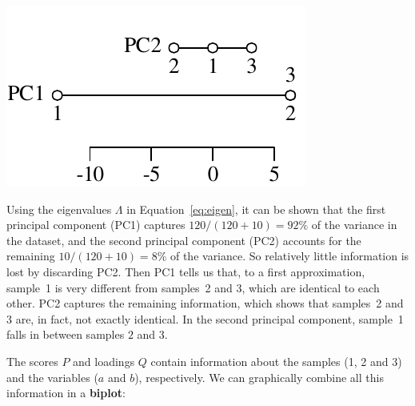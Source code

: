 \noindent\begin{minipage}[t][][b]{.27\textwidth}
  \includegraphics[width=\textwidth]{../figures/PCA2D2.pdf}\medskip
\end{minipage}
\begin{minipage}[t][][t]{.73\textwidth}
  \label{fig:PCA2D2}
\end{minipage}

Using the eigenvalues $\Lambda$ in Equation~\ref{eq:eigen}, it can be
shown that the first principal component (PC1) captures
$120/(120+10)=92\%$ of the variance in the dataset, and the second
principal component (PC2) accounts for the remaining $10/(120+10)=8\%$
of the variance. So relatively little information is lost by
discarding PC2. Then PC1 tells us that, to a first approximation,
sample~1 is very different from samples~2 and 3, which are identical
to each other. PC2 captures the remaining information, which shows
that samples~2 and 3 are, in fact, not exactly identical. In the
second principal component, sample~1 falls in between samples $2$ and
$3$.\medskip

The scores $P$ and loadings $Q$ contain information about the samples
(1, 2 and 3) and the variables ($a$ and $b$), respectively.  We can
graphically combine all this information in a \textbf{biplot}:

